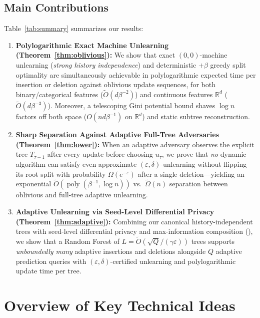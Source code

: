 \documentclass[11pt]{article}
\theoremstyle{definition}
\newcommand{\R}{\mathbb{R}}
\newcommand{\poly}{\operatorname{poly}}
\begin{document}
\subsection*{Main Contributions}
Table~\ref{tab:summary} summarizes our results:
\begin{enumerate}[leftmargin=1.5em]
    \item \textbf{Polylogarithmic Exact Machine Unlearning (Theorem~\ref{thm:oblivious}):} We show that exact $(0,0)$-machine unlearning (\emph{strong history independence}) and deterministic $+\beta$ greedy split optimality are simultaneously achievable in polylogarithmic expected time per insertion or deletion against oblivious update sequences, for both binary/categorical features ($\tilde{O}(d\beta^{-2})$) and continuous features $\R^d$ ($\tilde{O}(d\beta^{-3})$). Moreover, a telescoping Gini potential bound shaves $\log n$ factors off both space ($O(nd\beta^{-1})$ on $\R^d$) and static subtree reconstruction.
    \item \textbf{Sharp Separation Against Adaptive Full-Tree Adversaries (Theorem~\ref{thm:lower}):} When an adaptive adversary observes the explicit tree $T_{\tau-1}$ after every update before choosing $u_\tau$, we prove that \emph{no} dynamic algorithm can satisfy even approximate $(\varepsilon, \delta)$-unlearning without flipping its root split with probability $\Omega(e^{-\varepsilon})$ after a single deletion---yielding an exponential $\tilde{O}(\poly(\beta^{-1}, \log n))$ vs.\ $\tilde{\Omega}(n)$ separation between oblivious and full-tree adaptive unlearning.
    \item \textbf{Adaptive Unlearning via Seed-Level Differential Privacy (Theorem~\ref{thm:adaptive}):} Combining our canonical history-independent trees with seed-level differential privacy and max-information composition (\cite{dwork2015generalization,gupta2021adaptive,beimel2022dynamic}), we show that a Random Forest of $L = \tilde{O}(\sqrt{Q}/(\gamma\varepsilon))$ trees supports \emph{unboundedly many} adaptive insertions and deletions alongside $Q$ adaptive prediction queries with $(\varepsilon,\delta)$-certified unlearning and polylogarithmic update time per tree.
\end{enumerate}

\section{Overview of Key Technical Ideas}
\end{document}
